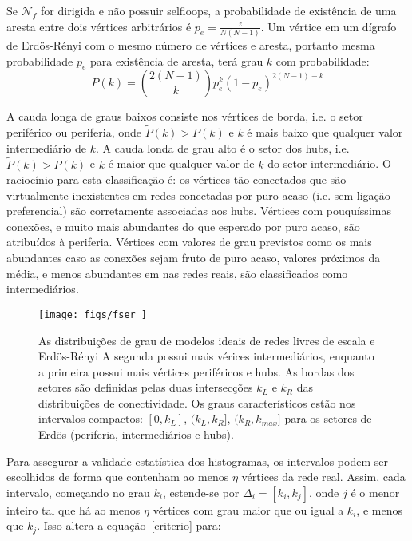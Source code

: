 \documentclass[a4paper,openright,12pt]{report} %
\begin{document}
Se $\mathcal{N}_f$ for dirigida e não possuir selfloops, a probabilidade
de existência de uma aresta entre dois vértices arbitrários é
$p_e=\frac{z}{N(N-1)}$.
Um vértice em um dígrafo de Erdös-Rényi com o mesmo número de vértices e aresta,
portanto mesma probabilidade
$p_e$
para existência de aresta, terá grau $k$ com probabilidade:
\begin{equation}
	P(k)=\binom{2(N-1)}{k}p_e^k(1-p_e)^{2(N-1)-k}
\end{equation}

A cauda longa de graus baixos consiste nos vértices de borda,
i.e. o setor periférico ou periferia, onde
$\widetilde{P}(k)>P(k)$ e $k$ é mais baixo
que qualquer valor intermediário de $k$.
A cauda londa de grau alto é o setor dos hubs,
i.e.
$\widetilde{P}(k)>P(k)$ e $k$ é maior que qualquer valor de $k$ do setor
intermediário.
O raciocínio para esta classificação é: os vértices tão conectados
que são virtualmente inexistentes em redes conectadas por puro acaso
(i.e. sem ligação preferencial) são corretamente associadas
aos hubs.
Vértices com pouquíssimas conexões, e muito mais abundantes do que esperado
por puro acaso, são atribuídos à periferia.
Vértices com valores de grau previstos como os mais abundantes caso
as conexões sejam fruto de puro acaso, valores próximos da média,
e menos abundantes em nas redes reais, são classificados como intermediários.


\begin{figure}[!h]
	\centering
	\texttt{[image: figs/fser\_]}
	\caption{As distribuições de grau de modelos ideais de redes livres de escala e Erdös-Rényi
		A segunda possui mais vérices intermediários, enquanto a primeira possui mais vértices
		periféricos e hubs. As bordas dos setores são definidas pelas duas intersecções $k_L$
		e $k_R$ das distribuições de conectividade.
		Os graus característicos estão nos intervalos compactos:
                $[0,k_L]$, $(k_L,k_R]$, $(k_R,k_{max}]$
	para os setores de Erdös (periferia, intermediários e hubs).}	
		\label{fig:setores}
\end{figure}

Para assegurar a validade estatística dos histogramas, os intervalos podem
ser escolhidos de forma que contenham ao menos $\eta$ vértices da rede real.
Assim, cada intervalo, começando no grau $k_i$, estende-se por
$\Delta_i=[k_{i},k_{j}]$,
onde $j$ é o menor inteiro tal que há ao menos $\eta$ vértices com grau maior que ou igual a $k_i$,
e menos que $k_j$. Isso altera a equação~\ref{criterio} para:
\end{document}
